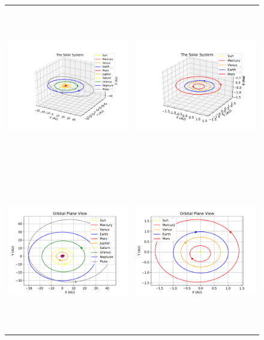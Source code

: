 \documentclass{article}
\begin{document}
\begin{figure}[H]
  \begin{center}
  \begin{tabular}{cc}
  \includegraphics[height=70mm, width=80mm]{Figures/all_planets_isometric.pdf}&
  \includegraphics[height=70mm, width=80mm]{Figures/inner_planets_isometric.pdf}\\
  \includegraphics[height=70mm, width=80mm]{Figures/top_down_view_all_planets.pdf}&
  \includegraphics[height=70mm, width=80mm]{Figures/inner_planets_top_down.pdf}\\

\end{tabular}
\end{center}
\end{figure}
\end{document}
